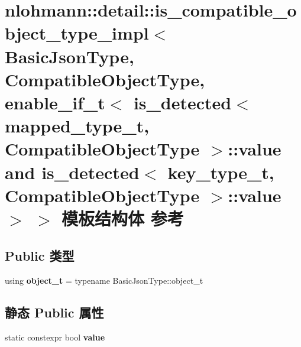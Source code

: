 \hypertarget{structnlohmann_1_1detail_1_1is__compatible__object__type__impl_3_01_basic_json_type_00_01_compatfbe9a153c4ecce445c98bbdd2d65f605}{}\section{nlohmann\+::detail\+::is\+\_\+compatible\+\_\+object\+\_\+type\+\_\+impl$<$ Basic\+Json\+Type, Compatible\+Object\+Type, enable\+\_\+if\+\_\+t$<$ is\+\_\+detected$<$ mapped\+\_\+type\+\_\+t, Compatible\+Object\+Type $>$\+::value and is\+\_\+detected$<$ key\+\_\+type\+\_\+t, Compatible\+Object\+Type $>$\+::value $>$ $>$ 模板结构体 参考}
\label{structnlohmann_1_1detail_1_1is__compatible__object__type__impl_3_01_basic_json_type_00_01_compatfbe9a153c4ecce445c98bbdd2d65f605}
\subsection*{Public 类型}
\begin{DoxyCompactItemize}
\item 
\mbox{\label{structnlohmann_1_1detail_1_1is__compatible__object__type__impl_3_01_basic_json_type_00_01_compatfbe9a153c4ecce445c98bbdd2d65f605_a551e9ee372c1b24b632e6b668c231a62}} 
using {\bfseries object\+\_\+t} = typename Basic\+Json\+Type\+::object\+\_\+t
\end{DoxyCompactItemize}
\subsection*{静态 Public 属性}
\begin{DoxyCompactItemize}
\item 
static constexpr bool {\bfseries value}
\end{DoxyCompactItemize}


